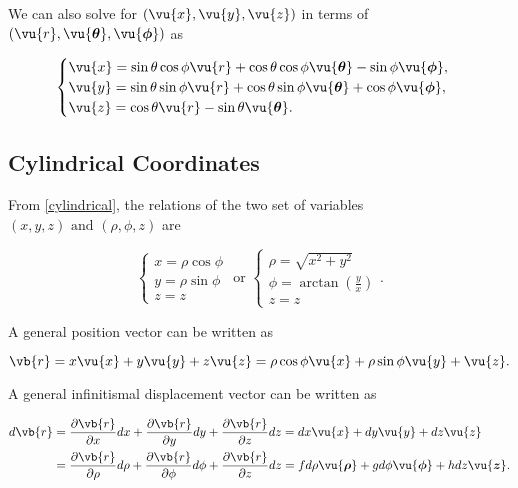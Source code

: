 \documentclass[english,a4paper,12pt]{report}
\begin{document}
We can also solve for \((\vu{x} , \vu{y}, \vu{z} )\) in terms of \((\vu{r} , \vu{\boldsymbol{\theta } }, \vu{\boldsymbol{\phi } } )\) as  

\begin{equation}
    \begin{cases}
        \vu{x} = \sin \theta \cos \phi \vu{r} + \cos \theta \cos \phi \vu{\boldsymbol{\theta } } - \sin \phi \vu{\boldsymbol{\phi } }, \\
        \vu{y} = \sin \theta \sin \phi \vu{r} + \cos \theta \sin \phi \vu{\boldsymbol{\theta } } + \cos \phi \vu{\boldsymbol{\phi } }, \\
        \vu{z} = \cos \theta \vu{r} - \sin \theta \vu{\boldsymbol{\theta } }.
    \end{cases}
\end{equation}



	
\subsection{Cylindrical Coordinates}

From \cref{cylindrical}, the relations of the two set of variables \((x,y,z) \text { and } (\rho , \phi , z)\)  are

\begin{equation}
    \begin{cases} x = \rho \cos \phi \\ y = \rho \sin \phi \\ z = z \end{cases} \text { or } \begin{cases} \rho  = \sqrt{x^2+y^2} \\ \phi = \arctan {\left( \frac{y}{x}  \right)} \\ z = z \end{cases}. 
\end{equation}

A general position vector can be written as 

\begin{equation}
    \vb{r} = x \vu{x} + y \vu{y} + z \vu{z} = \rho \cos \phi  \vu{x} + \rho \sin \phi \vu{y} + \vu{z} .
\end{equation}

A general infinitismal displacement vector can be written as 

\begin{equation}
    \begin{aligned}
    d \vb{r} &= \frac{\partial \vb{r} }{\partial x} dx + \frac{\partial \vb{r} }{\partial y} dy + \frac{\partial \vb{r} }{\partial z} dz = dx \vu{x} + dy \vu{y} + dz \vu{z} \\ &= \frac{\partial \vb{r} }{\partial \rho } d\rho  + \frac{\partial \vb{r} }{\partial \phi  }d \phi  + \frac{\partial \vb{r} }{\partial z}d z =f d \rho  \vu{\boldsymbol{\rho } }  +g d\phi \vu{\boldsymbol{\phi  } } +h  d z\vu{\boldsymbol{z} }. 
    \end{aligned}
\end{equation}
\end{document}

